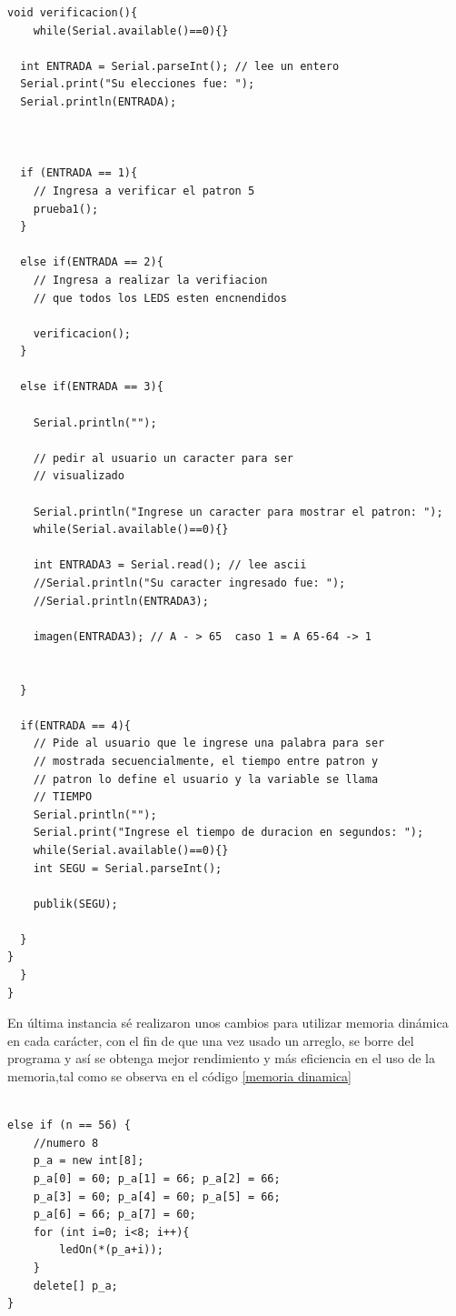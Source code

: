 \documentclass{article}
\begin{document}
\begin{lstlisting}[language=arduino, label=pruebaON]
void verificacion(){ 
    while(Serial.available()==0){}
    
  int ENTRADA = Serial.parseInt(); // lee un entero 
  Serial.print("Su elecciones fue: ");
  Serial.println(ENTRADA);
  
  
  
  if (ENTRADA == 1){
    // Ingresa a verificar el patron 5 
    prueba1();
  }
  
  else if(ENTRADA == 2){
    // Ingresa a realizar la verifiacion
    // que todos los LEDS esten encnendidos
    
    verificacion();
  }
  
  else if(ENTRADA == 3){
   
    Serial.println("");

    // pedir al usuario un caracter para ser
    // visualizado
    
    Serial.println("Ingrese un caracter para mostrar el patron: ");
    while(Serial.available()==0){}
    
  	int ENTRADA3 = Serial.read(); // lee ascii 
  	//Serial.println("Su caracter ingresado fue: ");
  	//Serial.println(ENTRADA3);
    
    imagen(ENTRADA3); // A - > 65  caso 1 = A 65-64 -> 1 

    
  }
  
  if(ENTRADA == 4){
    // Pide al usuario que le ingrese una palabra para ser
    // mostrada secuencialmente, el tiempo entre patron y 
    // patron lo define el usuario y la variable se llama
    // TIEMPO
	Serial.println("");
    Serial.print("Ingrese el tiempo de duracion en segundos: ");
    while(Serial.available()==0){}
    int SEGU = Serial.parseInt(); 
  
	publik(SEGU);
    
  }
}
  }
}
\end{lstlisting}

En última instancia sé realizaron unos cambios para utilizar memoria dinámica en cada carácter, con el fin de que una vez usado un arreglo, se borre del programa y así se obtenga mejor rendimiento y más eficiencia en el uso de la memoria,tal como se observa en el código \ref{memoria dinamica}



\begin{lstlisting}[language=arduino, label=memoria dinamica]

else if (n == 56) {
    //numero 8
    p_a = new int[8];
    p_a[0] = 60; p_a[1] = 66; p_a[2] = 66;
    p_a[3] = 60; p_a[4] = 60; p_a[5] = 66;
    p_a[6] = 66; p_a[7] = 60;
    for (int i=0; i<8; i++){
    	ledOn(*(p_a+i));
    }
    delete[] p_a;
}
\end{lstlisting}
\end{document}
